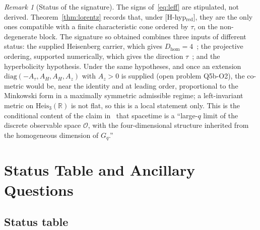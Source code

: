 \documentclass[11pt,a4paper]{article}
\theoremstyle{definition}
\theoremstyle{remark}
\newtheorem{remark}[theorem]{Remark}
\newcommand{\HeisR}{\mathrm{Heis}_3(\mathbb{R})}
\newcommand{\Dhom}{D_{\mathrm{hom}}}
\begin{document}
    \begin{remark}[Status of the signature]
      \label{rem:emergence}
      The signs of~\eqref{eq:leff} are stipulated, not derived.
      Theorem~\ref{thm:lorentz} records that, under [H-hyp$_{\mathrm{red}}$], they are the only ones compatible with
      a finite characteristic cone ordered by $\tau$, on the non-degenerate block.
      The signature so obtained combines three inputs of different status: the supplied Heisenberg carrier, which
      gives $\Dhom = 4$~\cite{Beau2026m,Beau2026HeisenbergStructure}; the projective ordering, supported numerically,
      which gives the direction $\tau$~\cite{Beau2026pto}; and the hyperbolicity hypothesis.
      Under the same hypotheses, and once an extension $\mathrm{diag}(-A_\tau, A_H, A_H, A_z)$ with $A_z > 0$ is
      supplied (open problem Q5b-O2), the co-metric would be, near the identity and at leading order, proportional to
      the Minkowski form in a maximally symmetric admissible regime; a left-invariant metric on $\HeisR$ is not flat,
      so this is a local statement only.
      This is the conditional content of the claim in~\cite{Cosmochrony} that spacetime is a ``large-$q$ limit of
      the discrete observable space $\mathcal{O}$, with the four-dimensional structure inherited from the homogeneous
      dimension of $G_q$.''
    \end{remark}

  \section{Status Table and Ancillary Questions}
  \label{sec:status}

  \subsection{Status table}
\end{document}
